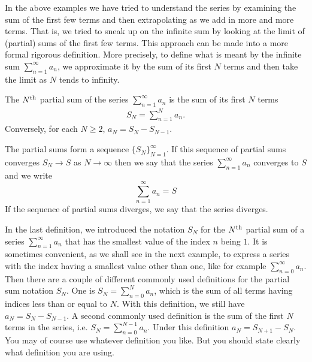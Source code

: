 In the above examples we have tried to understand the series by examining
the sum of the first few terms and then extrapolating as
we add in more and more terms. That is, we tried to sneak up on the
infinite sum by looking at the limit of (partial) sums of the first few terms. This approach can be made into a more formal rigorous definition.
More precisely, to define what is meant by the infinite sum
$\sum_{n=1}^\infty a_n$, we approximate it by the sum of its first
$N$ terms and then take the limit as $N$ tends to infinity.
\begin{defn}\label{def:SRseries}
The $N^{\rm th}$ partial sum of the series $\sum_{n=1}^\infty a_n$ is the sum of its first $N$ terms
\begin{align*}
S_N=\sum_{n=1}^N a_n.
\end{align*}
Conversely, for each $N\ge 2$, $a_N=S_N-S_{N-1}$.

The partial sums form a sequence $\big\{S_N\big\}_{N=1}^\infty$.
If this sequence of partial sums converges $S_N \to S$ as
$N\rightarrow\infty$  then we say that the series $\sum_{n=1}^\infty a_n$
converges to $S$ and we write
\begin{equation*}
\sum_{n=1}^\infty a_n=S
\end{equation*}
If the sequence of partial sums diverges, we say that the series diverges.
\end{defn}

In the last definition, we introduced the notation $S_N$ for the $N^{\rm th}$ partial sum of a series 
$\sum_{n=1}^\infty a_n$ that has the smallest value of the index $n$ being $1$. 
It is sometimes convenient, as we shall see in the next example, to express a series with the 
index having a smallest value other than one, like for example 
$\sum_{n=0}^\infty a_n$. Then there are a couple of different commonly used definitions for the partial 
sum notation $S_N$. One is $S_N=\sum_{n=0}^N a_n$, which is the sum of all terms having indices less 
than or equal to $N$. With this definition, we still have $a_N=S_N-S_{N-1}$. A second commonly used 
definition is the sum of the first $N$ terms in the series, i.e. $S_N=\sum_{n=0}^{N-1} a_n$. Under this 
definition $a_N=S_{N+1}-S_N$. You may of course use whatever definition you like. But you should state 
clearly what definition you are using.  

